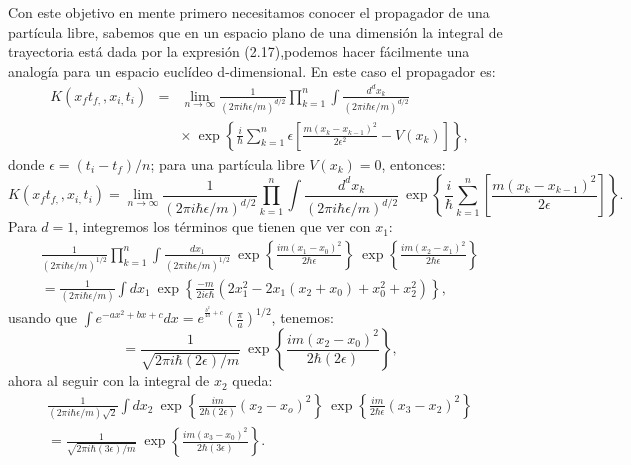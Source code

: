 Con este objetivo en mente primero necesitamos conocer el propagador de una partícula libre, sabemos que en un espacio plano de una dimensión la integral de trayectoria está dada por la expresión (2.17),podemos hacer fácilmente una analogía para un espacio euclídeo d-dimensional. En este caso el propagador es:
\begin{eqnarray}
\nonumber K(x_{f}t_{f,},x_{i,}t_{i})&=&\lim_{n\to\infty}\frac{1}{(2\pi i\hbar\epsilon/m)^{d/2}}\prod_{k=1}^{n}\int\frac{d^{d}x_{k}}{(2\pi i\hbar\epsilon/m)^{d/2}}\\
&&\times \ \exp\left\{ \frac{i}{\hbar}\sum_{k=1}^{n}\epsilon\left[\frac{m(x_{k}-x_{k-1})^{2}}{2\epsilon^{2}}-V(x_{k})\right]\right\}, 
\end{eqnarray}
donde $\epsilon=(t_i-t_f)/n$; para una partícula libre $V(x_k)=0$, entonces:
\begin{equation}
K(x_{f}t_{f,},x_{i,}t_{i})=\lim_{n\to\infty}\frac{1}{(2\pi i\hbar\epsilon/m)^{d/2}}\prod_{k=1}^{n}\int\frac{d^{d}x_{k}}{(2\pi i\hbar\epsilon/m)^{d/2}}\ \exp\left\{ \frac{i}{\hbar}\sum_{k=1}^{n}\left[\frac{m(x_{k}-x_{k-1})^{2}}{2\epsilon}\right]\right\}.
\end{equation}
Para $d=1$, integremos los términos que tienen que ver con $x_1$:
\begin{eqnarray}
\nonumber \frac{1}{(2\pi i\hbar\epsilon/m)^{1/2}}\prod_{k=1}^{n}\int\frac{dx_{1}}{(2\pi i\hbar\epsilon/m)^{1/2}}\ \exp\left\{ \frac{im(x_{1}-x_{0})^{2}}{2\hbar\epsilon}\right\} \ \exp\left\{ \frac{im(x_{2}-x_{1})^{2}}{2\hbar\epsilon}\right\}\\
\nonumber =\frac{1}{(2\pi i\hbar\epsilon/m)}\int dx_{1}\ \exp\left\{ \frac{-m}{2i\epsilon\hbar}\left(2x_{1}^{2}-2x_{1}(x_{2}+x_{0})+x_{0}^{2}+x_{2}^{2}\right)\right\},
\end{eqnarray}
usando que $ \int e^{-ax^{2}+bx+c}dx=e^{^{\frac{b^{2}}{4a}+c}}\left(\frac{\pi}{a}\right)^{1/2}$, tenemos:
\begin{equation}
\nonumber =\frac{1}{\sqrt{2\pi i\hbar(2\epsilon)/m}}\ \exp\left\{ \frac{im(x_{2}-x_{0})^{2}}{2\hbar(2\epsilon)}\right\},
\end{equation}
ahora al seguir con la integral de $x_2$ queda:
\begin{align}
\nonumber  \frac{1}{(2\pi i\hbar\epsilon/m)\sqrt{2}}\int dx_{2}\ \exp\left\{ \frac{im}{2\hbar(2\epsilon)}\left(x_{2}-x_{o}\right)^{2}\right\} \ \exp\left\{ \frac{im}{2\hbar\epsilon}\left(x_{3}-x_{2}\right)^{2}\right\} \\
=\frac{1}{\sqrt{2\pi i\hbar(3\epsilon)/m}}\ \exp\left\{ \frac{im(x_{3}-x_{0})^{2}}{2\hbar(3\epsilon)}\right\}.
\end{align}
